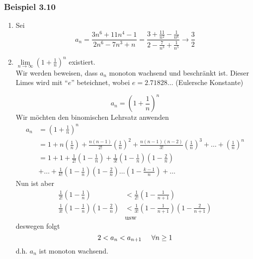 \subsubsection*{Beispiel 3.10}
\begin{enumerate}
\item Sei \[{a_n} = \frac{{3{n^6} + 11{n^4} - 1}}{{2{n^6} - 7{n^3} + n}} = \frac{{3 + \frac{{11}}{{{n^2}}} - \frac{1}{{{n^6}}}}}{{2 - \frac{7}{{{n^3}}} + \frac{1}{{{n^5}}}}} \to \frac{3}{2}\]
\item $\mathop {\lim }\limits_{n \to \infty } {\left( {1 + \frac{1}{n}} \right)^n}$ existiert. \\

Wir werden beweisen, dass $a_n$ monoton wachsend und beschränkt ist. Dieser Limes wird mit ``$e$'' beteichnet, wobei $e=2.71828\dots$ (Eulersche Konstante)
\begin{beweis}{}
\[a_n={\left( {1 + \frac{1}{n}} \right)^n}\]
Wir möchten den binomischen Lehrsatz anwenden
\begin{align*}
{a_n} &={\left( {1 + \frac{1}{n}} \right)^n}\\
&=1 + n\left( {\frac{1}{n}} \right) + \frac{{n(n - 1)}}{{2!}}{\left( {\frac{1}{n}} \right)^2} + \frac{{n(n - 1)(n - 2)}}{{3!}}{\left( {\frac{1}{n}} \right)^3} +  \ldots  + {\left( {\frac{1}{n}} \right)^n}\\
&=1 + 1 + \frac{1}{{2!}}\left( {1 - \frac{1}{n}} \right) + \frac{1}{{3!}}\left( {1 - \frac{1}{n}} \right)\left( {1 - \frac{2}{n}} \right)\\
&+\ldots  + \frac{1}{{k!}}\left( {1 - \frac{1}{n}} \right)\left( {1 - \frac{2}{n}} \right) \ldots \left( {1 - \frac{{k - 1}}{n}} \right) +  \ldots
\end{align*}
Nun ist aber
\begin{align*}
\frac{1}{{2!}}\left( {1 - \frac{1}{n}} \right)&< \frac{1}{{2!}}\left( {1 - \frac{1}{{n + 1}}} \right)\\
\frac{1}{{3!}}\left( {1 - \frac{1}{n}} \right)\left( {1 - \frac{2}{n}} \right)&< \frac{1}{{3!}}\left( {1 - \frac{1}{{n + 1}}} \right)\left( {1 - \frac{2}{{n + 1}}} \right)\\
&\text{usw}
\end{align*}
deswegen folgt \[2 < a_n < a_{n+1}\hspace{5mm}\forall n\geq 1\]
d.h. $a_n$ ist monoton wachsend.\\


\end{beweis}
\end{enumerate}
